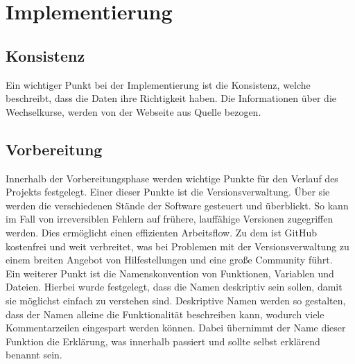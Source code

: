 \documentclass[conference]{IEEEtran}
\begin{document}
\section{Implementierung}

\subsection{Konsistenz}
Ein wichtiger Punkt bei der Implementierung ist die Konsistenz, welche beschreibt, dass die Daten ihre Richtigkeit haben. Die Informationen über die Wechselkurse, werden von der Webseite aus Quelle \cite{waechselkurse} bezogen. 

\subsection{Vorbereitung}
Innerhalb der Vorbereitungsphase werden wichtige Punkte für den Verlauf des Projekts festgelegt. Einer dieser Punkte ist die Versionsverwaltung. Über sie werden die verschiedenen Stände der Software gesteuert und überblickt. So kann im Fall von irreversiblen Fehlern auf frühere, lauffähige Versionen zugegriffen werden. Dies ermöglicht einen effizienten Arbeitsflow. Zu dem ist GitHub kostenfrei und weit verbreitet, was bei Problemen mit der Versionsverwaltung zu einem breiten Angebot von Hilfestellungen und eine große Community führt.\\
Ein weiterer Punkt ist die Namenskonvention von Funktionen, Variablen und Dateien. Hierbei wurde festgelegt, dass die Namen deskriptiv sein sollen, damit sie möglichst einfach zu verstehen sind. Deskriptive Namen werden so gestalten, dass der Namen alleine die Funktionalität beschreiben kann, wodurch viele Kommentarzeilen eingespart werden können. Dabei übernimmt der Name dieser Funktion die Erklärung, was innerhalb passiert und sollte selbst erklärend benannt sein.\\
\end{document}
